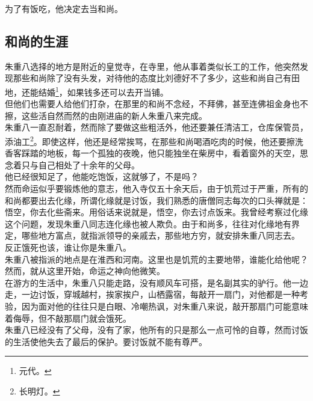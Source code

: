 \begin{multicols}{\theparacolNo}
为了有饭吃，他决定去当和尚。\\

\subsection{和尚的生涯}
朱重八选择的地方是附近的皇觉寺，在寺里，他从事着类似长工的工作，他突然发现那些和尚除了没有头发，对待他的态度比刘德好不了多少，这些和尚自己有田地，还能结婚\footnote{元代。}，如果钱多还可以去开当铺。\\

但他们也需要人给他们打杂，在那里的和尚不念经，不拜佛，甚至连佛祖金身也不擦，这些活自然而然的由刚进庙的新人朱重八来完成。\\

朱重八一直忍耐着，然而除了要做这些粗活外，他还要兼任清洁工，仓库保管员，添油工\footnote{长明灯。}。即使这样，他还是经常挨骂，在那些和尚喝酒吃肉的时候，他还要擦洗香客踩踏的地板，每一个孤独的夜晚，他只能独坐在柴房中，看着窗外的天空，思念着只与自己相处了十余年的父母。\\

他已经很知足了，他能吃饱饭，这就够了，不是吗？\\

然而命运似乎要锻炼他的意志，他入寺仅五十余天后，由于饥荒过于严重，所有的和尚都要出去化缘，所谓化缘就是讨饭，我们熟悉的唐僧同志每次的口头禅就是：悟空，你去化些斋来。用俗话来说就是，悟空，你去讨点饭来。我曾经考察过化缘这个问题，发现朱重八同志连化缘也被人欺负。由于和尚多，往往对化缘地有界定，哪些地方富点，就指派领导的亲戚去，那些地方穷，就安排朱重八同志去。\\

反正饿死也该，谁让你是朱重八。\\

朱重八被指派的地点是在淮西和河南。这里也是饥荒的主要地带，谁能化给他呢？\\

然而，就从这里开始，命运之神向他微笑。\\

在游方的生活中，朱重八只能走路，没有顺风车可搭，是名副其实的驴行。他一边走，一边讨饭，穿城越村，挨家挨户，山栖露宿，每敲开一扇门，对他都是一种考验，因为面对他的往往只是白眼、冷嘲热讽，对朱重八来说，敲开那扇门可能意味着侮辱，但不敲那扇门就会饿死。\\

朱重八已经没有了父母，没有了家，他所有的只是那么一点可怜的自尊，然而讨饭的生活使他失去了最后的保护。要讨饭就不能有尊严。\\


\end{multicols}
